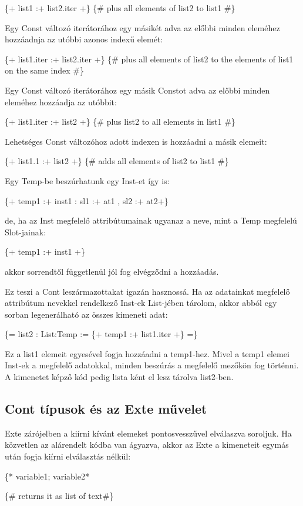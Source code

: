 {\{+ list1 :+ list2.iter +\} \{\# plus all elements of list2 to list1 \#\}

Egy Const változó iterátorához egy másikét adva az előbbi minden eleméhez hozzáadnja az utóbbi azonos indexű elemét:

\{+ list1.iter :+ list2.iter +\} \{\# plus all elements of list2 to the elements of list1 on the same index \#\}

Egy Const változó iterátorához egy másik Constot adva az előbbi minden eleméhez hozzáadja az utóbbit:

\{+ list1.iter :+ list2 +\} \{\# plus list2 to all elements in list1 \#\}

Lehetséges Const változóhoz adott indexen is hozzáadni a másik elemeit:

\{+ list1.1 :+ list2 +\} \{\# adds all elements of list2 to list1 \#\}

Egy Temp-be beszúrhatunk egy Inst-et így is:

\{+ temp1 :+ inst1 : sl1 :+ at1 , sl2 :+ at2+\}

de, ha az Inst megfelelő attribútumainak ugyanaz a neve, mint a Temp megfelelú Slot-jainak:

\{+ temp1 :+ inst1 +\}

akkor sorrendtől függetlenül jól fog elvégződni a hozzáadás.

Ez teszi a Cont leszármazottakat igazán hasznossá.
Ha az adatainkat megfelelő attribútum nevekkel rendelkező Inst-ek List-jében tárolom,
akkor abból egy sorban legenerálható az összes kimeneti adat:

\{= list2 : List:Temp := \{+ temp1 :+ list1.iter +\} =\}

Ez a list1 elemeit egyesével fogja hozzáadni a temp1-hez.
Mivel a temp1 elemei Inst-ek a megfelelő adatokkal, minden beszúrás a megfelelő mezőkön fog történni.
A kimenetet képző kód pedig lista ként el lesz tárolva list2-ben.



\subsection{Cont típusok és az Exte művelet}
Exte zárójelben a kiírni kívánt elemeket pontosvesszűvel elválaszva soroljuk.
Ha közvetlen az alárendelt kódba van ágyazva, akkor az Exte a kimeneteit egymás után fogja kiírni elválasztás nélkül:

\{* variable1; variable2*} \{\# returns it as list of text\#\}


